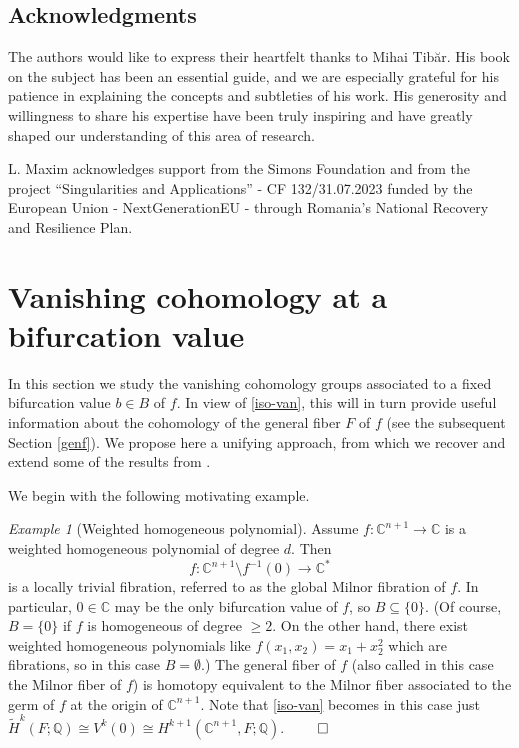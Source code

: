 \documentclass[12pt,leqno,twoside]{amsart}
\theoremstyle{remark}
\theoremstyle{remark}
\theoremstyle{definition}
\theoremstyle{remark}
\newtheorem{example}[theorem]{\sc Example}
\theoremstyle{remark}
\theoremstyle{remark}
\numberwithin{equation}{section}  %
\def\bex{\begin{example}}
\def\eex{\end{example}}
\newcommand{\bC}{\mathbb{C}}
\newcommand{\bQ}{\mathbb{Q}}
\begin{document}
\subsection{Acknowledgments} 
The authors would like to express their heartfelt thanks to Mihai Tib\u{a}r. His book on the subject has been an essential guide, and we are especially grateful for his patience in explaining the concepts and subtleties of his work. His generosity and willingness to share his expertise have been truly inspiring and have greatly shaped our understanding of this area of research.

L. Maxim acknowledges support from the Simons Foundation and from the project ``Singularities and Applications'' - CF 132/31.07.2023 funded by the European Union - NextGenerationEU - through Romania's National Recovery and Resilience Plan. 


\section{Vanishing cohomology at a bifurcation value}\label{vc}
In this section we study the vanishing cohomology groups associated to a fixed bifurcation value $b\in B$ of $f$. In view of \eqref{iso-van}, this will in turn provide useful information about the cohomology of the general fiber $F$ of $f$ (see the subsequent Section \ref{genf}). We propose here a unifying approach, from which we recover and extend some of the results from \cite{Bre,Di}.

We begin with the following motivating example.
\bex[Weighted homogeneous polynomial]\label{whp}
Assume $f\colon \bC^{n+1} \to \bC$ is a weighted homogeneous polynomial of degree $d$. %
Then $$f\colon \bC^{n+1} \setminus f^{-1}(0) \to \bC^*$$ is a locally trivial fibration, referred to as the global Milnor fibration of $f$. In particular, $0 \in \bC$ may be the only bifurcation value of $f$, so $B\subseteq\{0\}$. (Of course, $B=\{0\}$ if $f$ is homogeneous of degree $\geq 2$. On the other hand, there exist weighted homogeneous polynomials like $f(x_1,x_2)=x_1+x_2^2$  which are fibrations, so in this case $B=\emptyset$.) The general fiber of $f$ (also called in this case the Milnor fiber of $f$) is homotopy equivalent to the Milnor fiber associated to the germ of $f$ at the origin of $\bC^{n+1}$. Note that \eqref{iso-van} becomes in this case just $\widetilde{H}^k(F;\bQ)\cong V^k(0) \cong H^{k+1}(\bC^{n+1}, F; \bQ)$. $\hfill\qed$
\eex
\end{document}
